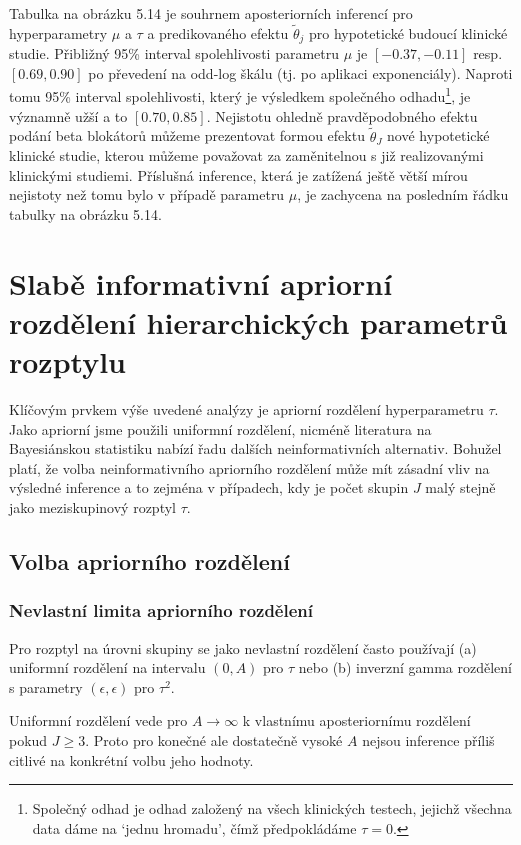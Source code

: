 Tabulka na obrázku 5.14 je souhrnem aposteriorních inferencí pro hyperparametry $\mu$ a $\tau$ a predikovaného efektu $\tilde{\theta}_j$ pro hypotetické budoucí klinické studie. Přibližný 95\% interval spolehlivosti parametru $\mu$ je $[-0.37, -0.11]$ resp. $[0.69, 0.90]$ po převedení na odd-log škálu (tj. po aplikaci exponenciály). Naproti tomu 95\% interval spolehlivosti, který je výsledkem společného odhadu\footnote{Společný odhad je odhad založený na všech klinických testech, jejichž všechna data dáme na `jednu hromadu', čímž předpokládáme $\tau = 0$.}, je významně užší a to $[0.70, 0.85]$. Nejistotu ohledně pravděpodobného efektu podání beta blokátorů můžeme prezentovat formou efektu $\tilde{\theta}_J$ nové hypotetické klinické studie, kterou můžeme považovat za zaměnitelnou s již realizovanými klinickými studiemi. Příslušná inference, která je zatížená ještě větší mírou nejistoty než tomu bylo v případě parametru $\mu$, je zachycena na posledním řádku tabulky na obrázku 5.14.

\section{Slabě informativní apriorní rozdělení hierarchických parametrů rozptylu}

Klíčovým prvkem výše uvedené analýzy je apriorní rozdělení hyperparametru $\tau$. Jako apriorní jsme použili uniformní rozdělení, nicméně literatura na Bayesiánskou statistiku nabízí řadu dalších neinformativních alternativ. Bohužel platí, že volba neinformativního apriorního rozdělení může mít zásadní vliv na výsledné inference a to zejména v případech, kdy je počet skupin $J$ malý stejně jako meziskupinový rozptyl $\tau$.

\subsection{Volba apriorního rozdělení}

\subsubsection{Nevlastní limita apriorního rozdělení}

Pro rozptyl na úrovni skupiny se jako nevlastní rozdělení často používají (a) uniformní rozdělení na intervalu $(0, A)$ pro $\tau$ nebo (b) inverzní gamma rozdělení s parametry $(\epsilon, \epsilon)$ pro $\tau^2$.

Uniformní rozdělení vede pro $A \rightarrow \infty$ k vlastnímu aposteriornímu rozdělení pokud $J \ge 3$. Proto pro konečné ale dostatečně vysoké $A$ nejsou inference příliš citlivé na konkrétní volbu jeho hodnoty.

